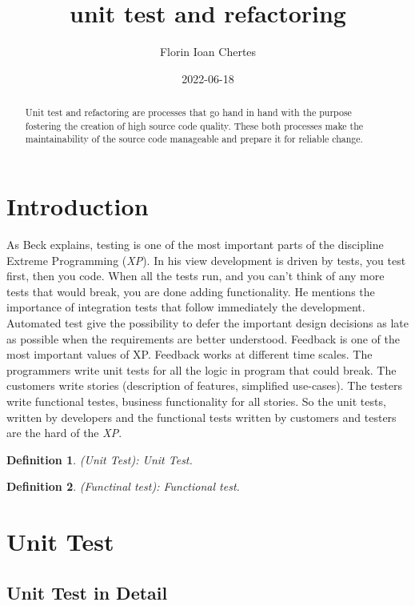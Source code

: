 \documentclass{article}
\title{unit test and refactoring}
\date{2022-06-18}
\author{Florin Ioan Chertes}
\newtheorem{definition}{Definition}
\begin{document}
\maketitle
{}
\newpage
{}


\begin{abstract}
Unit test and refactoring are processes that go hand in hand with the purpose fostering the creation of high source code quality. These both processes make the maintainability of the source code manageable and prepare it for reliable change.
\end{abstract}

\section{Introduction}

As Beck \cite{BecAnd04extreme, beck2001planning} explains, testing is one of the most important parts of the discipline Extreme Programming (\textit{XP}). In his view development is driven by tests, you test first, then you code. When all the tests run, and you can't think of any more tests that would break, you are done adding functionality. He mentions the importance of integration tests that follow immediately the development. Automated test give the possibility to defer the important design decisions as late as possible when the requirements are better understood. Feedback is one of the most important values of XP. Feedback works at different time scales. The programmers write unit tests for all the logic in program that could break. The customers write stories (description of features, simplified use-cases). The testers write functional testes, business functionality for all stories. So the unit tests, written by developers and the functional tests written by customers and testers are the hard of the \textit{XP}.   

\begin{definition}
   (Unit Test): Unit Test.
\end{definition}

\begin{definition}
  (Functinal test): Functional test.
\end{definition}


\section{Unit Test}

\subsection{Unit Test in Detail}
\end{document}
